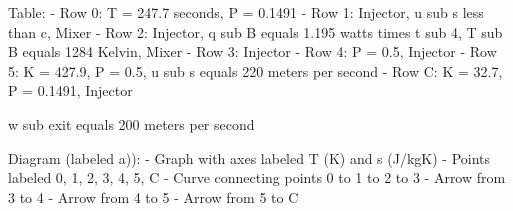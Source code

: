 Table:
- Row 0: T = 247.7 seconds, P = 0.1491
- Row 1: Injector, u sub s less than c, Mixer
- Row 2: Injector, q sub B equals 1.195 watts times t sub 4, T sub B equals 1284 Kelvin, Mixer
- Row 3: Injector
- Row 4: P = 0.5, Injector
- Row 5: K = 427.9, P = 0.5, u sub s equals 220 meters per second
- Row C: K = 32.7, P = 0.1491, Injector

w sub exit equals 200 meters per second

Diagram (labeled a)):
- Graph with axes labeled T (K) and s (J/kgK)
- Points labeled 0, 1, 2, 3, 4, 5, C
- Curve connecting points 0 to 1 to 2 to 3
- Arrow from 3 to 4
- Arrow from 4 to 5
- Arrow from 5 to C